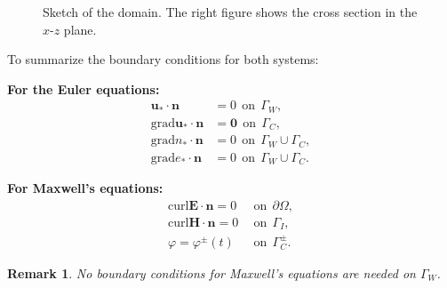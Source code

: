 \documentclass{article}
\newtheorem*{remark}{Remark}
\begin{document}
\begin{figure}
\begin{minipage}{0.49\textwidth}
{}
\end{minipage}
\caption{Sketch of the domain. The right figure shows the cross section in the $x$-$z$ plane.}
\label{fig:domain_sketch}
\end{figure}


    To summarize the boundary conditions for both systems:
    
\vspace{10pt}
\begin{minipage}[t]{0.49\textwidth}
    \textbf{For the Euler equations:}
    \begin{align*}
    \mathbf{u_*}\cdot \mathbf{n} &= 0 \ \ \text{on} \ \ \Gamma_W, \\
    \text{grad}\mathbf{u_*} \cdot \mathbf{n} &= \mathbf{0} \ \ \text{on} \ \ \Gamma_C, \\
    \text{grad}n_* \cdot \mathbf{n} &= 0 \ \ \text{on} \ \ \Gamma_W \cup \Gamma_C, \\
    \text{grad}e_* \cdot \mathbf{n} &= 0 \ \ \text{on} \ \ \Gamma_W \cup \Gamma_C.
\end{align*}
\end{minipage}
\begin{minipage}[t]{0.49\textwidth}
    \textbf{For Maxwell's equations:}
    \begin{align*}
    \text{curl} \mathbf{E} \cdot \mathbf{n} = 0\ \ &\text{on} \ \  \partial\Omega,  \\
    \text{curl} \mathbf{H} \cdot \mathbf{n} = 0\ \ &\text{on} \ \  \Gamma_I,  \\
    \varphi = \varphi^\pm(t)\ \ &\text{on} \ \ \Gamma_C^\pm.
    \end{align*}
\end{minipage}

\vspace{10pt}
\begin{remark}
    No boundary conditions for Maxwell's equations are needed on $\Gamma_W$.
\end{remark}
\end{document}
